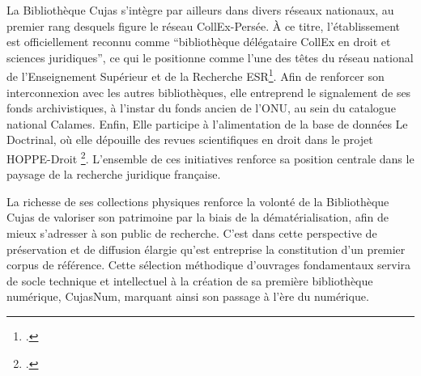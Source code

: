 La Bibliothèque Cujas s'intègre par ailleurs dans divers réseaux nationaux, au premier rang desquels figure le réseau CollEx-Persée. À ce titre, l'établissement est officiellement reconnu comme \enquote{bibliothèque délégataire CollEx en droit et sciences juridiques}, ce qui le positionne comme l'une des têtes du réseau national de l'Enseignement Supérieur et de la Recherche \ac{ESR}\footcite{BibliothequeInteruniversitaireCujas}. Afin de renforcer son interconnexion avec les autres bibliothèques, elle entreprend le signalement de ses fonds archivistiques, à l'instar du fonds ancien de l'ONU, au sein du catalogue national Calames. Enfin, Elle participe à l'alimentation de la base de données Le Doctrinal, où elle dépouille des revues scientifiques en droit dans le projet \ac{HOPPE-Droit} \footcite{HoppeDroit}. L'ensemble de ces initiatives renforce sa position centrale dans le paysage de la recherche juridique française.

La richesse de ses collections physiques renforce la volonté de la Bibliothèque Cujas de valoriser son patrimoine par la biais de la dématérialisation, afin de mieux s'adresser à son public de recherche. C'est dans cette perspective de préservation et de diffusion élargie qu'est entreprise la constitution d'un premier corpus de référence. Cette sélection méthodique d'ouvrages fondamentaux servira de socle technique et intellectuel à la création de sa première bibliothèque numérique, CujasNum, marquant ainsi son passage à l'ère du numérique.